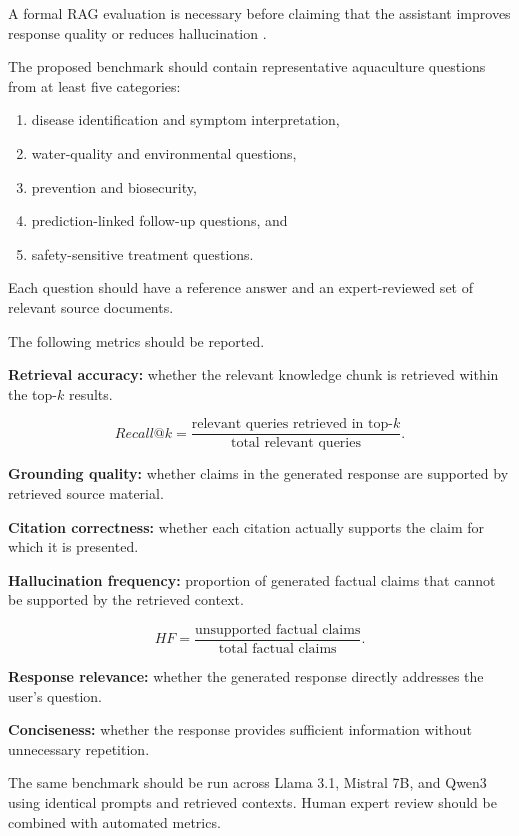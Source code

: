 \documentclass[conference]{IEEEtran}
\begin{document}
A formal RAG evaluation is necessary before claiming that the assistant improves response quality or reduces hallucination \cite{b4}.

The proposed benchmark should contain representative aquaculture questions from at least five categories:

\begin{enumerate}
    \item disease identification and symptom interpretation,
    \item water-quality and environmental questions,
    \item prevention and biosecurity,
    \item prediction-linked follow-up questions, and
    \item safety-sensitive treatment questions.
\end{enumerate}

Each question should have a reference answer and an expert-reviewed set of relevant source documents.

The following metrics should be reported.

\textbf{Retrieval accuracy:} whether the relevant knowledge chunk is retrieved within the top-$k$ results.

\begin{equation}
Recall@k =
\frac{\text{relevant queries retrieved in top-}k}
{\text{total relevant queries}}.
\end{equation}

\textbf{Grounding quality:} whether claims in the generated response are supported by retrieved source material.

\textbf{Citation correctness:} whether each citation actually supports the claim for which it is presented.

\textbf{Hallucination frequency:} proportion of generated factual claims that cannot be supported by the retrieved context.

\begin{equation}
HF =
\frac{\text{unsupported factual claims}}
{\text{total factual claims}}.
\end{equation}

\textbf{Response relevance:} whether the generated response directly addresses the user's question.

\textbf{Conciseness:} whether the response provides sufficient information without unnecessary repetition.

The same benchmark should be run across Llama 3.1, Mistral 7B, and Qwen3 using identical prompts and retrieved contexts. Human expert review should be combined with automated metrics.
\end{document}
